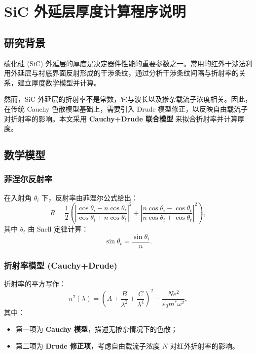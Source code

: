 \section{SiC 外延层厚度计算程序说明}

\subsection{研究背景}
碳化硅 (SiC) 外延层的厚度是决定器件性能的重要参数之一。常用的红外干涉法利用外延层与衬底界面反射形成的干涉条纹，通过分析干涉条纹间隔与折射率的关系，建立厚度数学模型并计算。

然而，SiC 外延层的折射率不是常数，它与波长以及掺杂载流子浓度相关。因此，在传统 Cauchy 色散模型基础上，需要引入 Drude 模型修正，以反映自由载流子对折射率的影响。本文采用 \textbf{Cauchy+Drude 联合模型} 来拟合折射率并计算厚度。

\subsection{数学模型}

\subsubsection{菲涅尔反射率}
在入射角 $\theta_i$ 下，反射率由菲涅尔公式给出：
\begin{equation}
R = \frac{1}{2}\left( 
\left|\frac{\cos\theta_i - n \cos\theta_t}{\cos\theta_i + n \cos\theta_t}\right|^2 
+ 
\left|\frac{n\cos\theta_i - \cos\theta_t}{n\cos\theta_i + \cos\theta_t}\right|^2 
\right),
\end{equation}
其中 $\theta_t$ 由 Snell 定律计算：
\begin{equation}
\sin\theta_t = \frac{\sin\theta_i}{n}.
\end{equation}

\subsubsection{折射率模型 (Cauchy+Drude)}
折射率的平方写作：
\begin{equation}
n^2(\lambda) = \left(A + \frac{B}{\lambda^2} + \frac{C}{\lambda^4}\right)^2 - \frac{Ne^2}{\varepsilon_0 m^\ast \omega^2},
\end{equation}
其中：
\begin{itemize}
    \item 第一项为 \textbf{Cauchy 模型}，描述无掺杂情况下的色散；
    \item 第二项为 \textbf{Drude 修正项}，考虑自由载流子浓度 $N$ 对红外折射率的影响。
\end{itemize}

